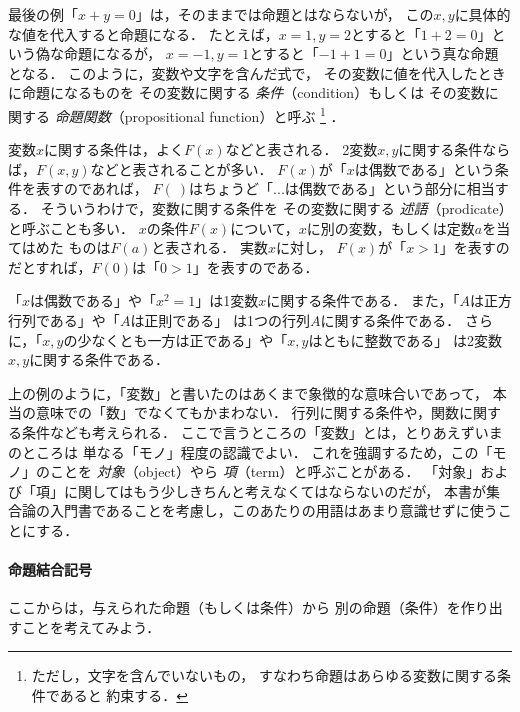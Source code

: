   最後の例「$x+y=0$」は，そのままでは命題とはならないが，
  この$x,  y$に具体的な値を代入すると命題になる．
  たとえば，$x=1,  y=2$とすると「$1+2=0$」という偽な命題になるが，
  $x=-1,  y=1$とすると「$-1+1=0$」という真な命題となる．
  このように，変数や文字を含んだ式で，
  その変数に値を代入したときに命題になるものを
  その変数に関する
  \emph{条件}（condition）もしくは
  その変数に関する
  \emph{命題関数}（propositional function）と呼ぶ
  \footnote{
    ただし，文字を含んでいないもの，
    すなわち命題はあらゆる変数に関する条件であると
  約束する．}
  ．
  
  変数$x$に関する条件は，よく$F(x)$などと表される．
  2変数$x,  y$に関する条件ならば，$F(x, y)$などと表されることが多い．
  $F(x)$が「$x$は偶数である」という条件を表すのであれば，
  $F( \ )$はちょうど「...は偶数である」という部分に相当する．
  そういうわけで，変数に関する条件を
  その変数に関する
  \emph{述語}（prodicate）と呼ぶことも多い．
  $x$の条件$F(x)$について，$x$に別の変数，もしくは定数$a$を当てはめた
  ものは$F(a)$と表される．
  実数$x$に対し，
  $F(x)$が「$x>1$」を表すのだとすれば，$F(0)$は「$0>1$」を表すのである．

  \begin{ex}
    「$x$は偶数である」や「$x^2=1$」は1変数$x$に関する条件である．
    また，「$A$は正方行列である」や「$A$は正則である」
    は1つの行列$A$に関する条件である．
    さらに，「$x,  y$の少なくとも一方は正である」や「$x,  y$はともに整数である」
    は2変数$x,  y$に関する条件である．
  \end{ex}

  上の例のように，「変数」と書いたのはあくまで象徴的な意味合いであって，
  本当の意味での「数」でなくてもかまわない．
  行列に関する条件や，関数に関する条件なども考えられる．
  ここで言うところの「変数」とは，とりあえずいまのところは
  単なる「モノ」程度の認識でよい．
  これを強調するため，この「モノ」のことを
  \emph{対象}（object）やら
  \emph{項}（term）と呼ぶことがある．
  「対象」および「項」に関してはもう少しきちんと考えなくてはならないのだが，
  本書が集合論の入門書であることを考慮し，このあたりの用語はあまり意識せずに使うことにする．

  

  \paragraph{命題結合記号}
  ここからは，与えられた命題（もしくは条件）から
  別の命題（条件）を作り出すことを考えてみよう．
  
